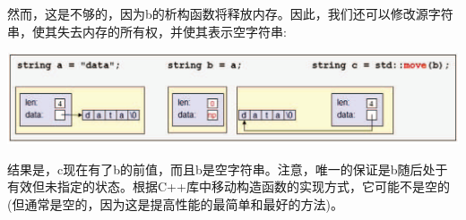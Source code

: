 然而，这是不够的，因为b的析构函数将释放内存。因此，我们还可以修改源字符串，使其失去内存的所有权，并使其表示空字符串:\par

\begin{center}
	\includegraphics[width=1.0\textwidth]{content/1/chapter1/images/22}
\end{center}

结果是，c现在有了b的前值，而且b是空字符串。注意，唯一的保证是b随后处于有效但未指定的状态。根据C++库中移动构造函数的实现方式，它可能不是空的(但通常是空的，因为这是提高性能的最简单和最好的方法)。\par


















